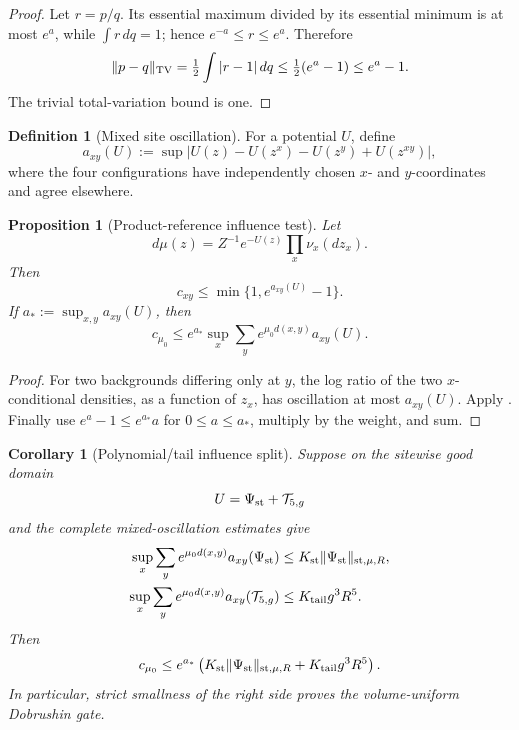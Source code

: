 \documentclass[11pt,oneside]{book}
\newtheorem{proposition}[theorem]{Proposition}
\newtheorem{corollary}[theorem]{Corollary}
\theoremstyle{definition}
\newtheorem{definition}[theorem]{Definition}
\theoremstyle{remark}
\begin{document}
\begin{proof}
Let \(r=p/q\).  Its essential maximum divided by its essential
minimum is at most \(e^a\), while \(\int r\,dq=1\); hence
\(e^{-a}\le r\le e^a\).  Therefore
\[
 \|p-q\|_{\rm TV}
 =\tfrac12\int|r-1|\,dq
 \le\tfrac12(e^a-1)\le e^a-1.
\]
The trivial total-variation bound is one.
\end{proof}

\begin{definition}[Mixed site oscillation]
\label{def:e8v6-mixed}
For a potential \(U\), define
\[
 a_{xy}(U):=
 \sup|U(z)-U(z^x)-U(z^y)+U(z^{xy})|,                \label{eq:e8v6-axy}
\]
where the four configurations have independently chosen \(x\)- and
\(y\)-coordinates and agree elsewhere.
\end{definition}

\begin{proposition}[Product-reference influence test]
\label{prop:e8v6-product-test}
Let
\[
 d\mu(z)=Z^{-1}e^{-U(z)}\prod_x\nu_x(dz_x).          \label{eq:e8v6-product-density}
\]
Then
\[
 c_{xy}\le\min\{1,e^{a_{xy}(U)}-1\}.                \label{eq:e8v6-c-from-a}
\]
If \(a_*:=\sup_{x,y}a_{xy}(U)\), then
\[
 c_{\mu_0}\le e^{a_*}
 \sup_x\sum_y e^{\mu_0d(x,y)}a_{xy}(U).             \label{eq:e8v6-c-row-test}
\]
\end{proposition}

\begin{proof}
For two backgrounds differing only at \(y\), the log ratio of the two
\(x\)-conditional densities, as a function of \(z_x\), has
oscillation at most \(a_{xy}(U)\).  Apply
.  Finally use
\(e^a-1\le e^{a_*}a\) for \(0\le a\le a_*\), multiply by the weight,
and sum.
\end{proof}

\begin{corollary}[Polynomial/tail influence split]
\label{cor:e8v6-poly-tail}
Suppose on the sitewise good domain
\[
 U=\Psi_{\rm st}+{\cal T}_{5,g}                     \label{eq:e8v6-U-split}
\]
and the complete mixed-oscillation estimates give
\begin{align}
 \sup_x\sum_y e^{\mu_0d(x,y)}a_{xy}(\Psi_{\rm st})
 &\le K_{\rm st}\|\Psi_{\rm st}\|_{{\rm st},\mu,R},
                                                               \label{eq:e8v6-a-poly}\\
 \sup_x\sum_y e^{\mu_0d(x,y)}a_{xy}({\cal T}_{5,g})
 &\le K_{\rm tail}g^3R^5.                            \label{eq:e8v6-a-tail}
\end{align}
Then
\[
 c_{\mu_0}
 \le e^{a_*}\left(
 K_{\rm st}\|\Psi_{\rm st}\|_{{\rm st},\mu,R}
 +K_{\rm tail}g^3R^5\right).                        \label{eq:e8v6-c-poly-tail}
\]
In particular, strict smallness of the right side proves the
volume-uniform Dobrushin gate.
\end{corollary}
\end{document}
